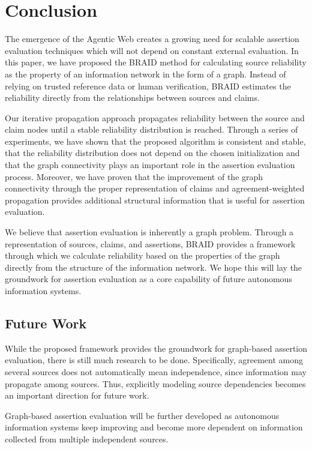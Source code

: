 \section{Conclusion}

The emergence of the Agentic Web creates a growing need for scalable assertion evaluation techniques which will not depend on constant external evaluation. In this paper, we have proposed the BRAID method for calculating source reliability as the property of an information network in the form of a graph. Instead of relying on trusted reference data or human verification, BRAID estimates the reliability directly from the relationships between sources and claims.

Our iterative propagation approach propagates reliability between the source and claim nodes until a stable reliability distribution is reached. Through a series of experiments, we have shown that the proposed algorithm is consistent and stable, that the reliability distribution does not depend on the chosen initialization and that the graph connectivity plays an important role in the assertion evaluation process. Moreover, we have proven that the improvement of the graph connectivity through the proper representation of claims and agreement-weighted propagation provides additional structural information that is useful for assertion evaluation.

We believe that assertion evaluation is inherently a graph problem. Through a representation of sources, claims, and assertions, BRAID provides a framework through which we calculate reliability based on the properties of the graph directly from the structure of the information network. We hope this will lay the groundwork for assertion evaluation as a core capability of future autonomous information systems.

\subsection{Future Work}

While the proposed framework provides the groundwork for graph-based assertion evaluation, there is still much research to be done. Specifically, agreement among several sources does not automatically mean independence, since information may propagate among sources. Thus, explicitly modeling source dependencies becomes an important direction for future work.

Graph-based assertion evaluation will be further developed as autonomous information systems keep improving and become more dependent on information collected from multiple independent sources.
